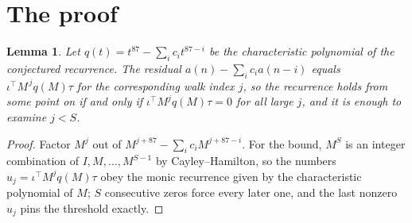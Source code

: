 \documentclass[11pt,a4paper]{article}
\theoremstyle{plain}
\newtheorem{lemma}[theorem]{Lemma}
\theoremstyle{definition}
\begin{document}
\section{The proof}

\begin{lemma}\label{lem:crit}
Let $q(t)=t^{87}-\sum_i c_it^{87-i}$ be the characteristic polynomial of the
conjectured recurrence. The residual $a(n)-\sum_ic_ia(n-i)$ equals
$\iota^{\!\top}M^{\,j}q(M)\tau$ for the corresponding walk index $j$, so the recurrence
holds from some point on if and only if $\iota^{\!\top}M^{j}q(M)\tau=0$ for all large $j$,
and it is enough to examine $j<S$.
\end{lemma}

\begin{proof}
Factor $M^{j}$ out of $M^{j+87}-\sum_ic_iM^{j+87-i}$. For the bound, $M^{S}$
is an integer combination of $I,M,\dots,M^{S-1}$ by Cayley--Hamilton, so the numbers
$u_j=\iota^{\!\top}M^{j}q(M)\tau$ obey the monic recurrence given by the characteristic
polynomial of $M$; $S$ consecutive zeros force every later one, and the last nonzero $u_j$
pins the threshold exactly.
\end{proof}
\end{document}
